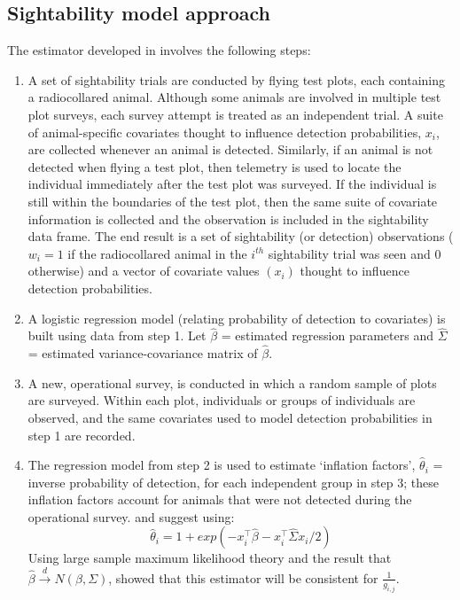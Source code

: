 \documentclass[nojss]{jss}
\begin{document}
\subsection{Sightability model approach}
The estimator developed in \citet{SS1989} involves the following
steps:
\begin{enumerate}
\item  A set of sightability trials are conducted by flying test plots, each containing a radiocollared animal.
  Although some animals are involved in
multiple test plot surveys, each survey attempt is treated as an
independent trial.  A suite of animal-specific covariates thought to
influence detection probabilities, $x_{i}$, are collected whenever
an animal is detected.  Similarly, if an animal is not detected when
flying a test plot, then telemetry is used to locate the individual
immediately after the test plot was surveyed.  If the individual is
still within the boundaries of the test plot, then the  same suite
of covariate information is collected and the observation is
included in the sightability data frame.  The end result is a set of
sightability (or detection) observations ($w_{i} = 1$ if the
radiocollared animal in the $i^{th}$
 sightability trial was seen and 0 otherwise) and a vector of covariate values $(x_{i})$ thought to influence detection
 probabilities.

\item  A logistic regression model (relating probability of detection to covariates) is built using data from step 1.  Let $\hat{\beta}$
= estimated regression parameters and  $\hat{\Sigma}$ = estimated variance-covariance matrix of $\hat{\beta}$.
\item  A new, operational survey, is conducted in which a random sample of plots are surveyed.  Within each
plot, individuals or groups of individuals are observed, and the
same covariates used to model detection probabilities in step 1 are
recorded.
\item The regression model from step 2 is used to estimate `inflation
factors', $\hat{\theta}_{i}$  = inverse probability of detection,
for each independent group in step 3;  these inflation factors
account for animals that were not detected during the operational
survey. \citet{SS1989} and \citet{Wong1996} suggest using:
\begin{equation}
\label{thetahat} \hat{\theta}_{i}=1+exp(-x_{i}^{\top}\hat{\beta}-
 x_{i}^{\top}\hat{\Sigma}x_{i}/2)
\end{equation}
Using large sample maximum likelihood
 theory and the result that $\hat{\beta}  \stackrel{d}{\to} N(\beta, \Sigma)$, \citet{SS1989} showed that this estimator will be consistent for $\frac{1}{g_{i,j}}$.



\end{enumerate}
\end{document}
